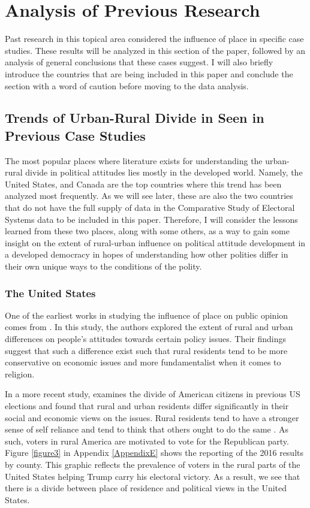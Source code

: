 \documentclass[12pt, titlepage]{article}
\begin{document}
\section{Analysis of Previous Research}

Past research in this topical area considered the influence of place in specific case studies. These results will be analyzed in this section of the paper, followed by an analysis of general conclusions that these cases suggest. I will also briefly introduce the countries that are being included in this paper and conclude the section with a word of caution before moving to the data analysis. 

\subsection{Trends of Urban-Rural Divide in Seen in Previous Case Studies}

The most popular places where literature exists for understanding the urban-rural divide in political attitudes lies mostly in the developed world. Namely, the United States, and Canada are the top countries where this trend has been analyzed most frequently. As we will see later, these are also the two countries that do not have the full supply of data in the Comparative Study of Electoral Systems data to be included in this paper. Therefore, I will consider the lessons learned from these two places, along with some others, as a way to gain some insight on the extent of rural-urban influence on political attitude development in a developed democracy in hopes of understanding how other polities differ in their own unique ways to the conditions of the polity.

\subsubsection{The United States}

One of the earliest works in studying the influence of place on public opinion comes from \cite{glenn_rural-urban_1967}. In this study, the authors explored the extent of rural and urban differences on people's attitudes towards certain policy issues. Their findings suggest that such a difference exist such that rural residents tend to be more conservative on economic issues and more fundamentalist when it comes to religion.

In a more recent study, \cite{gimpel_rural_2006} examines the divide of American citizens in previous US elections and found that rural and urban residents differ significantly in their social and economic views on the issues. Rural residents tend to have a stronger sense of self reliance and tend to think that others ought to do the same \citep{walsh_putting_2012}. As such, voters in rural America are motivated to vote for the Republican party. Figure \ref{figure3} in Appendix \ref{AppendixE} shows the \cite{NYT-trump} reporting of the 2016 results by county. This graphic reflects the prevalence of voters in the rural parts of the United States helping Trump carry his electoral victory. As a result, we see that there is a divide between place of residence and political views in the United States.
\end{document}
